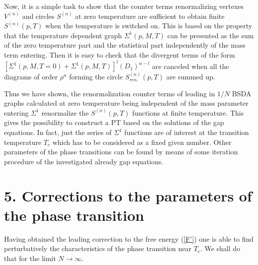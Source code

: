 \documentclass[a4paper,12pt]{article}
\begin{document}
Now, it is a simple task to show that the counter terms renormalizing
vertexes $V^{(n)}$ and circles $S^{(n)}$ at zero temperature are
sufficient to obtain finite $S^{(n)}(p, T)$ when the temperature is
switched on. This is based on the property that the temperature
dependent graph $\Sigma^1(p, M, T)$ can be presented as the sum of the
zero temperature part and the statistical part independently of the
mass term entering.  Then it is easy to check that the divergent terms
of the form $[\Sigma^1(p, M, T = 0) + \Sigma^1(p, M, T) ]^{l}
(D_1)^{n-l}$ are canceled when all the diagrams of order $\rho^n$
forming the circle $S^{(n)}_{ren.}(p, T)$ are summed up.

Thus we have shown, the renormalization counter terms of leading in
$1/N$ BSDA graphs calculated at zero temperature being independent of
the mass parameter entering $\Sigma^1$ renormalize the $S^{(n)}(p, T)$
functions at finite temperature. This gives the possibility to
construct a PT based on the solutions of the gap equations.  In fact,
just the series of $\Sigma^1$ functions are of interest at the
transition temperature $T_c$ which has to be considered as a fixed
given number. Other parameters of the phase transitions can be found
by means of some iteration procedure of the investigated already gap
equations.

\section*{5. Corrections to the parameters of the phase transition}

Having obtained the leading correction to the free energy (\ref{F'})
one is able to find perturbatively the characteristics of the phase
transition near $T_c$. We shall do that for the limit $N \to \infty$.
\end{document}
